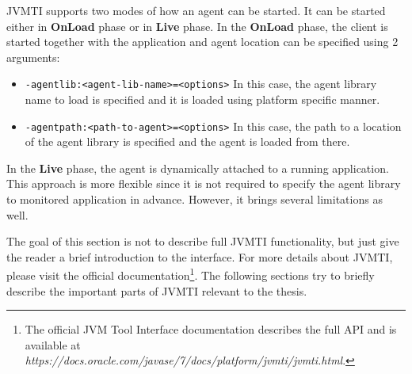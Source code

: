 JVMTI supports two modes of how an agent can be started. It can be started either in \textbf{OnLoad} phase or in \textbf{Live} phase. In the \textbf{OnLoad} phase, the client is started together with the application and agent location can be specified using 2 arguments:
\begin{itemize}
	\item \texttt{-agentlib:<agent-lib-name>=<options>} \newline
	In this case, the agent library name to load is specified and it is loaded using platform specific manner.
	\item \texttt{-agentpath:<path-to-agent>=<options>} \newline
	In this case, the path to a location of the agent library is specified and the agent is loaded from there.
\end{itemize}

In the \textbf{Live} phase, the agent is dynamically attached to a running application. This approach is more flexible since it is not required to specify the agent library to monitored application in advance. However, it brings several limitations as well.

The goal of this section is not to describe full JVMTI functionality, but just give the reader a brief introduction to the interface. For more details about JVMTI, please visit the official documentation\footnote{The official JVM Tool Interface documentation describes the full API and is available at \textit{https://docs.oracle.com/javase/7/docs/platform/jvmti/jvmti.html}.}. The following sections try to briefly describe the important parts of JVMTI relevant to the thesis.

